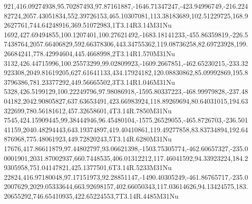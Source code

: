 921,416.09274938,95.70287493,97.87161887,-1646.71347247,-423.94996749,-216.22482724,2057.43051834,552.39726153,465.10307081,113.38183689,102.51229725,168.92627761,744.64248916,369.51072983,1T3.14R3.14M31Nu
1692,427.69494855,100.1207401,100.27621492,-1683.18141233,-455.86359819,-226.57438764,2057.66406829,592.66378306,443.34755362,119.08736258,82.69723928,199.26684241,778.42994604,445.4668998,2T3.14R1.570M31Nu
3132,426.44715996,100.25573299,99.02809923,-1609.2667851,-462.65230215,-233.32923308,2049.81619205,627.61641133,434.17924182,120.08830862,85.09992869,195.83796386,781.23377292,449.56665502,3T3.14R1.046M31Nu
5328,426.5199129,100.22249796,97.98086918,-1595.80337223,-468.99979828,-237.4804182,2042.90805827,637.63653491,423.66983924,118.89269694,80.64031015,194.63322699,780.56181612,457.32658601,4T3.14R.7850M31Nu
7545,424.15909445,99.38444946,96.45480104,-1575.26529055,-465.8726703,-236.50141159,2040.48294443,643.19374897,419.40410861,119.49277858,83.83734894,192.64876968,775.48061923,449.72820243,5T3.14R.6280M31Nu
17676,417.86611879,97.44802797,93.06621398,-1503.75305774,-462.60657327,-235.00001901,2031.87002937,660.7448535,406.01312212,117.46041592,94.33923224,184.29305958,751.04147821,425.1377501,6T3.14R.5233M31Nu
22824,416.97180048,97.17151973,92.28851147,-1490.40305249,-461.86765717,-235.02007629,2029.05333644,663.92698157,402.66050343,117.03614626,94.13424575,183.20655292,746.65410935,422.65224553,7T3.14R.4485M31Nu
